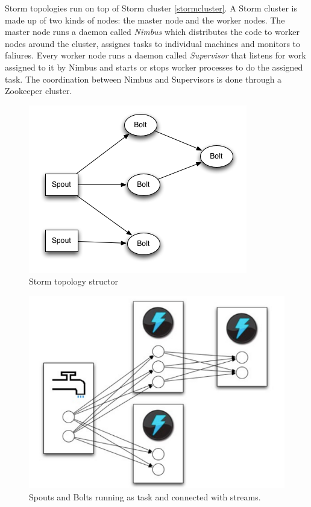 \documentclass[journal]{IEEEtran/IEEEtran}
\begin{document}
Storm topologies run on top of Storm cluster \ref{stormcluster}. A Storm cluster is made up of two kinds of nodes: the master node and the worker nodes. The master node runs a daemon called \textit{Nimbus} which distributes the code to worker nodes around the cluster, assignes tasks to individual machines and monitors to faliures. Every worker node runs a daemon called \textit{Supervisor} that listens for work assigned to it by Nimbus and starts or stops worker processes to do the assigned task. The coordination between Nimbus and Supervisors is done through a Zookeeper cluster.


\begin{figure}[htbp]
    \begin{center}
        \includegraphics[scale=0.55]{img/topology.png}
        \caption{Storm topology structor}
        \label{topology}
    \end{center}
\end{figure}

\begin{figure}[htbp]
    \begin{center}
        \includegraphics[scale=0.40]{img/tasks.png}
        \caption{Spouts and Bolts running as task and connected with streams.}
        \label{tasks}
    \end{center}
\end{figure}
\end{document}

